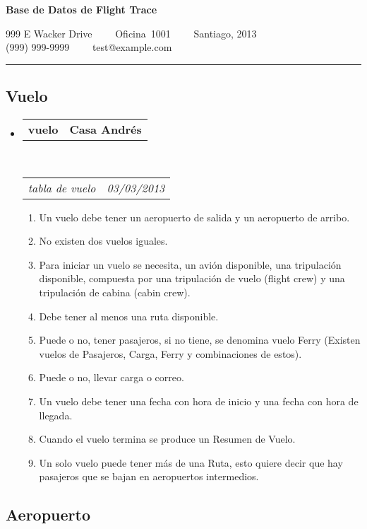 \documentclass[10pt,letterpaper]{article}
\makeatletter
\newcommand{\headerrow}[2]
{\begin{tabular*}{\linewidth}{l@{\extracolsep{\fill}}r}
	#1 &
	#2 \\
\end{tabular*}}
\makeatother
\begin{document}
\begin{center}
{\LARGE \textbf{Base de Datos de Flight Trace}}

999 E Wacker Drive\ \ \textbullet
\ \ Oficina\ 1001\ \ \textbullet
\ \ Santiago, 2013
\\
(999) 999-9999\ \ \textbullet
\ \ test@example.com
\end{center}

\hrule
\vspace{-0.4em}

\subsection*{Vuelo}

\begin{itemize}
	\parskip=0.1em

	\item
	\headerrow
		{\textbf{vuelo}}
		{\textbf{Casa Andrés}}
	\\
	\headerrow
		{\emph{tabla de vuelo}}
		{\emph{03/03/2013}}
	\begin{enumerate}
		\item Un vuelo debe tener un aeropuerto de salida y un aeropuerto de arribo.
		\item No existen dos vuelos iguales.
		\item Para iniciar un vuelo se necesita, un avión disponible, una tripulación disponible, compuesta por una tripulación de vuelo (flight crew) y una tripulación de cabina (cabin crew).
		\item Debe tener al menos una ruta disponible.
		\item Puede o no, tener pasajeros, si no tiene, se denomina vuelo Ferry (Existen vuelos de Pasajeros, Carga, Ferry y combinaciones de estos).
		\item Puede o no, llevar carga o correo.
		\item Un vuelo debe tener una fecha con hora de inicio y una fecha con hora de llegada.
		\item Cuando el vuelo termina se produce un Resumen de Vuelo.
		\item Un solo vuelo puede tener más de una Ruta, esto quiere decir que hay pasajeros que se bajan en aeropuertos intermedios.
	\end{enumerate}

\end{itemize}

\subsection*{Aeropuerto}
\end{document}
